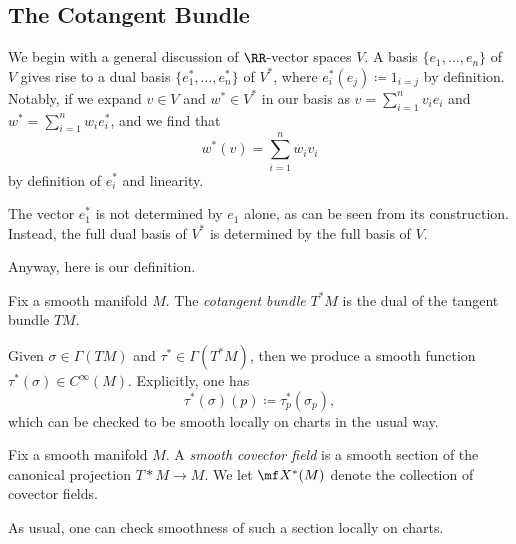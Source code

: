 \documentclass[../notes.tex]{subfiles}
\begin{document}
\subsection{The Cotangent Bundle}
We begin with a general discussion of $\RR$-vector spaces $V$. A basis $\{e_1,\ldots,e_n\}$ of $V$ gives rise to a dual basis $\{e_1^*,\ldots,e_n^*\}$ of $V^*$, where $e_i^*(e_j)\coloneqq1_{i=j}$ by definition. Notably, if we expand $v\in V$ and $w^*\in V^*$ in our basis as $v=\sum_{i=1}^nv_ie_i$ and $w^*=\sum_{i=1}^nw_ie_i^*$, and we find that
\[w^*(v)=\sum_{i=1}^nw_iv_i\]
by definition of $e_i^*$ and linearity.
\begin{remark}
	The vector $e_1^*$ is not determined by $e_1$ alone, as can be seen from its construction. Instead, the full dual basis of $V^*$ is determined by the full basis of $V$.
\end{remark}
Anyway, here is our definition.
\begin{definition}
	Fix a smooth manifold $M$. The \textit{cotangent bundle} $T^*M$ is the dual of the tangent bundle $TM$.
\end{definition}
\begin{remark}
	Given $\sigma\in\Gamma(TM)$ and $\tau^*\in\Gamma(T^*M)$, then we produce a smooth function $\tau^*(\sigma)\in C^\infty(M)$. Explicitly, one has
	\[\tau^*(\sigma)(p)\coloneqq\tau^*_p(\sigma_p),\]
	which can be checked to be smooth locally on charts in the usual way.
\end{remark}
\begin{definition}
	Fix a smooth manifold $M$. A \textit{smooth covector field} is a smooth section of the canonical projection $T*M\to M$. We let $\mf X^*(M)$ denote the collection of covector fields.
\end{definition}
As usual, one can check smoothness of such a section locally on charts.
\end{document}

